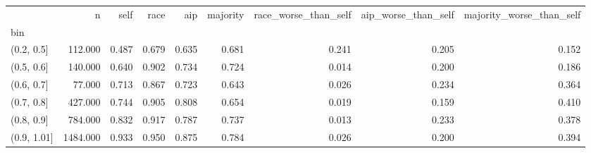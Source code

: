 \begin{tabular}{lrrrrrrrr}
\toprule
 & n & self & race & aip & majority & race\_worse\_than\_self & aip\_worse\_than\_self & majority\_worse\_than\_self \\
bin &  &  &  &  &  &  &  &  \\
\midrule
(0.2, 0.5] & 112.000 & 0.487 & 0.679 & 0.635 & 0.681 & 0.241 & 0.205 & 0.152 \\
(0.5, 0.6] & 140.000 & 0.640 & 0.902 & 0.734 & 0.724 & 0.014 & 0.200 & 0.186 \\
(0.6, 0.7] & 77.000 & 0.713 & 0.867 & 0.723 & 0.643 & 0.026 & 0.234 & 0.364 \\
(0.7, 0.8] & 427.000 & 0.744 & 0.905 & 0.808 & 0.654 & 0.019 & 0.159 & 0.410 \\
(0.8, 0.9] & 784.000 & 0.832 & 0.917 & 0.787 & 0.737 & 0.013 & 0.233 & 0.378 \\
(0.9, 1.01] & 1484.000 & 0.933 & 0.950 & 0.875 & 0.784 & 0.026 & 0.200 & 0.394 \\
\bottomrule
\end{tabular}
